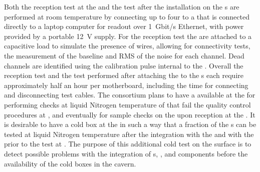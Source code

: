 Both the reception test at the  and the test after the
installation on the s are performed at room temperature 
by connecting up to four  to a  that is 
connected directly to a laptop computer for readout over 1~Gbit/s 
Ethernet, with power provided by a portable 12~V supply. For 
the reception test the  are attached to a capacitive 
load to simulate the presence of wires, allowing for connectivity 
tests, the measurement of the baseline and RMS of the noise for 
each channel. Dead channels are identified using the calibration 
pulse internal to the  . Overall the reception 
test and the test performed after attaching the  to the 
s each require approximately half an hour per motherboard, 
including  the time for connecting and disconnecting test cables.
The  consortium plans to have a  available
at the  for performing checks at liquid Nitrogen temperature
of  that fail the quality control procedures at \surf,
and eventually for sample checks on the  upon reception
at the . It is desirable to have a cold box at the 
in such a way that a fraction of the s can be tested at
liquid Nitrogen temperature after the integration with the 
and with the  prior to the test at 
\surf. The purpose of this additional cold test on the surface is to
detect possible problems with the integration of s, ,
and  components before the availability of the cold
boxes in the \surf cavern.

